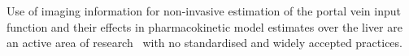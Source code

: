 Use of imaging information for non-invasive estimation of the portal vein input function and their effects in pharmacokinetic model estimates over the liver are an active area of research~\cite{Wang2018,HernandezLozano2019,Wang2021} with no standardised and widely accepted practices.


